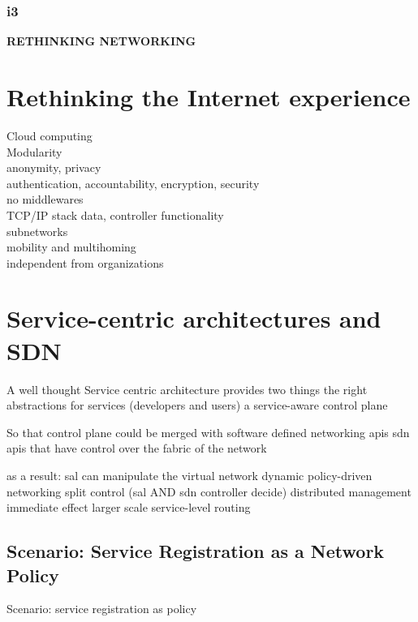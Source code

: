 \documentclass[12pt,a4paper,oneside]{article}
\begin{document}
\subsubsection{i3}


\newpage
\thispagestyle{empty}
{}
{\Huge \bf \noindent RETHINKING NETWORKING}
\newpage

\section{Rethinking the Internet experience}
Cloud computing
\\Modularity
\\anonymity, privacy
\\authentication, accountability, encryption, security
\\no middlewares
\\TCP/IP stack data, controller functionality
\\subnetworks
\\mobility and multihoming
\\independent from organizations


\newpage
\section{Service-centric architectures and SDN}
A well thought Service centric architecture provides two things
the right abstractions for services (developers and users)
a service-aware control plane

So that control plane could be merged with software defined networking apis
sdn apis that have control over the fabric of the network

as a result: sal can manipulate the virtual network
dynamic policy-driven networking
split control (sal AND sdn controller decide)
distributed management
immediate effect
larger scale service-level routing



\subsection{Scenario: Service Registration as a Network Policy}
Scenario:
service registration as policy


\newpage
\end{document}
